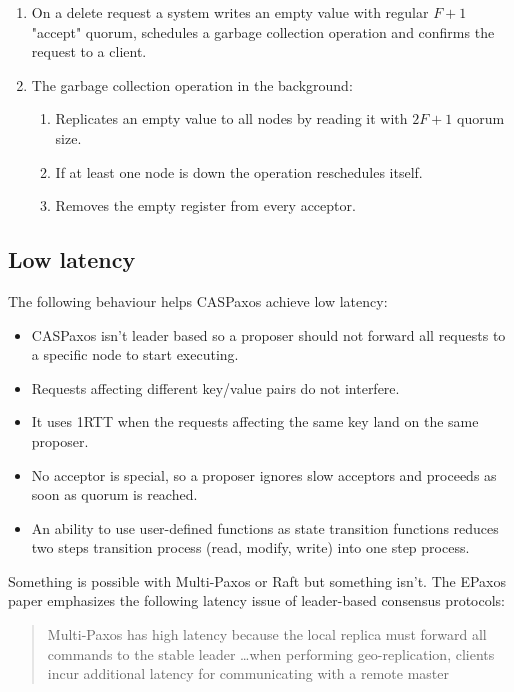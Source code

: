 \documentclass[12pt]{article}
\theoremstyle{definition}
\begin{document}
\begin{enumerate}
  \item On a delete request a system writes an empty value with regular $F+1$ "accept" quorum, schedules a garbage collection operation and confirms the request to a client.
  \item The garbage collection operation in the background:
  \begin{enumerate}
    \item Replicates an empty value to all nodes by reading it with $2F+1$ quorum size.
    \item If at least one node is down the operation reschedules itself.
    \item Removes the empty register from every acceptor.
  \end{enumerate}
\end{enumerate}

\newpage

\subsection{Low latency}

The following behaviour helps CASPaxos achieve low latency:
\begin{itemize}
  \item CASPaxos isn't leader based so a proposer should not forward all requests to a specific node to start executing.
  \item Requests affecting different key/value pairs do not interfere.
  \item It uses 1RTT when the requests affecting the same key land on the same proposer.
  \item No acceptor is special, so a proposer ignores slow acceptors and proceeds as soon as quorum is reached.
  \item An ability to use user-defined functions as state transition functions reduces two steps transition process (read, modify, write) into one step process.
\end{itemize}

Something is possible with Multi-Paxos or Raft but something isn't. The EPaxos paper emphasizes the following latency issue of leader-based consensus protocols:

\begin{quote}
Multi-Paxos has high latency because the local replica must forward all commands to the stable leader \ldots when performing geo-replication, clients incur additional latency for communicating with a remote master
\end{quote}
\end{document}
